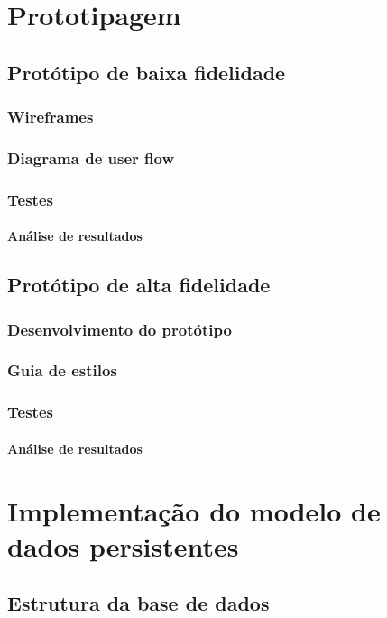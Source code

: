 \documentclass[11pt, twoside]{report}
\begin{document}
	
	\chapter{Prototipagem}
	\section{Protótipo de baixa fidelidade}
	\subsection{Wireframes}
	\subsection{Diagrama de user flow}
	\subsection{Testes}
	\subsubsection{Análise de resultados}
	
	\section{Protótipo de alta fidelidade}
	\subsection{Desenvolvimento do protótipo}
	\subsection{Guia de estilos}
	\subsection{Testes}
	\subsubsection{Análise de resultados}
	
	\chapter{Implementação do modelo de dados persistentes}
	\section{Estrutura da base de dados}
\end{document}
